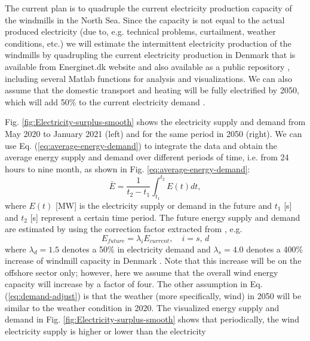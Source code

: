 \documentclass{ECOS_2021}
\begin{document}
The current plan is to quadruple the current
electricity production capacity of the windmills in the North Sea. Since the
capacity is not equal to the actual produced electricity (due to,
e.g. technical problems, curtailment, weather conditions, etc.) we
will estimate the intermittent electricity production of the windmills
by quadrupling the current electricity production in Denmark that
is available from Energinet.dk website and also available as a public
repository \cite{eftekhariSimulkadeStorageFirst2021}, including several
Matlab functions for analysis and visualizations. We can also assume that the 
domestic transport and heating will be fully electrified by 2050, which will add 50\% 
to the current electricity demand \cite{eftekhariQuantifyingRoleLiquid2020}.

Fig. \ref{fig:Electricity-surplus-smooth} shows the electricity supply
and demand from May 2020 to January 2021 (left) and for the same period
in 2050 (right). We can use Eq. (\ref{eq:average-energy-demand})
to integrate the data and obtain the average energy supply and demand
over different periods of time, i.e. from 24 hours to nine month,
as shown in Fig. \ref{eq:average-energy-demand}:
\begin{equation}
\bar{E}=\frac{1}{t_{2}-t_{1}}\int_{t_{1}}^{t_{2}}E\left(t\right)dt,\label{eq:average-energy-demand}
\end{equation}
where $E(t)$ {[}MW{]} is the electricity supply or demand in the
future and $t_{1}$ {[}s{]} and $t_{2}$ {[}s{]} represent a certain
time period. The future energy supply and demand are estimated by
using the correction factor extracted from \cite{eftekhariQuantifyingRoleLiquid2020},
e.g.
\begin{equation}
E_{future}=\lambda_{i}E_{current},\quad i=s,\,d\label{eq:demand-adjust}
\end{equation}
where $\lambda_{d}=1.5$ denotes a 50\% in electricity demand \cite{eftekhariQuantifyingRoleLiquid2020}
and $\lambda_{s}=4.0$ denotes a 400\% increase of windmill capacity
in Denmark \cite{danishenergyagencyEnergyIslands2021,dandreaSynergiesOffshoreEnergy2021}.
Note that this increase will be on the offshore sector only; however,
here we assume that the overall wind energy capacity will increase
by a factor of four. The other assumption in Eq. (\ref{eq:demand-adjust})
is that the weather (more specifically, wind) in 2050 will be similar
to the weather condition in 2020. The visualized energy supply and
demand in Fig. \ref{fig:Electricity-surplus-smooth} shows that periodically,
the wind electricity supply is higher or lower than the electricity
\end{document}
